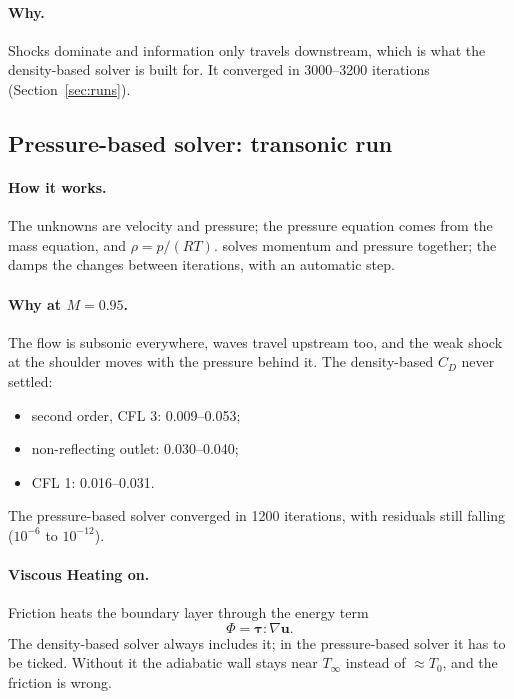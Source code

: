 \paragraph{Why.} Shocks dominate and information only travels downstream, which is what the density-based
solver is built for. It converged in 3000--3200 iterations (Section~\ref{sec:runs}).

\subsection{Pressure-based solver: transonic run}

\paragraph{How it works.} The unknowns are velocity and pressure; the pressure equation comes from the mass
equation, and $\rho = p/(RT)$.  solves momentum and pressure together; the  damps the changes between iterations, with an automatic step.

\paragraph{Why at $M = 0.95$.} The flow is subsonic everywhere, waves travel upstream too, and the weak
shock at the shoulder moves with the pressure behind it. The density-based $C_D$ never settled:
\begin{itemize}
\item second order, CFL 3: 0.009--0.053;
\item non-reflecting outlet: 0.030--0.040;
\item CFL 1: 0.016--0.031.
\end{itemize}
The pressure-based solver converged in 1200 iterations, with residuals still falling ($10^{-6}$ to
$10^{-12}$).

\paragraph{Viscous Heating on.} Friction heats the boundary layer through the energy term
\begin{equation}
\Phi = \boldsymbol\tau : \nabla\mathbf u.
\end{equation}
The density-based solver always includes it; in the pressure-based solver it has to be ticked. Without it
the adiabatic wall stays near $T_\infty$ instead of $\approx T_0$, and the friction is wrong.

